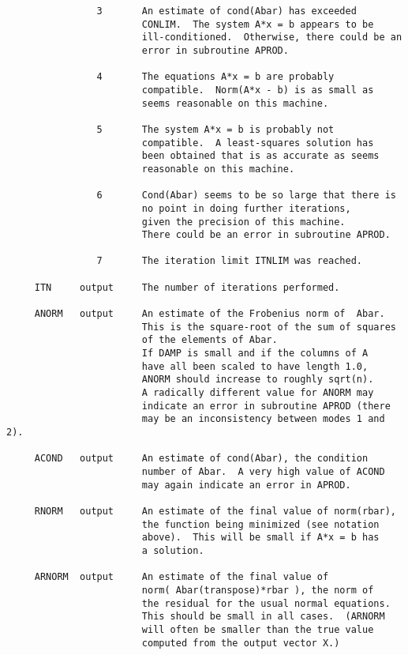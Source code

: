 \begin{verbatim}
                3       An estimate of cond(Abar) has exceeded
                        CONLIM.  The system A*x = b appears to be
                        ill-conditioned.  Otherwise, there could be an
                        error in subroutine APROD.

                4       The equations A*x = b are probably
                        compatible.  Norm(A*x - b) is as small as
                        seems reasonable on this machine.

                5       The system A*x = b is probably not
                        compatible.  A least-squares solution has
                        been obtained that is as accurate as seems
                        reasonable on this machine.

                6       Cond(Abar) seems to be so large that there is
                        no point in doing further iterations,
                        given the precision of this machine.
                        There could be an error in subroutine APROD.

                7       The iteration limit ITNLIM was reached.

     ITN     output     The number of iterations performed.

     ANORM   output     An estimate of the Frobenius norm of  Abar.
                        This is the square-root of the sum of squares
                        of the elements of Abar.
                        If DAMP is small and if the columns of A
                        have all been scaled to have length 1.0,
                        ANORM should increase to roughly sqrt(n).
                        A radically different value for ANORM may
                        indicate an error in subroutine APROD (there
                        may be an inconsistency between modes 1 and 2).

     ACOND   output     An estimate of cond(Abar), the condition
                        number of Abar.  A very high value of ACOND
                        may again indicate an error in APROD.

     RNORM   output     An estimate of the final value of norm(rbar),
                        the function being minimized (see notation
                        above).  This will be small if A*x = b has
                        a solution.

     ARNORM  output     An estimate of the final value of
                        norm( Abar(transpose)*rbar ), the norm of
                        the residual for the usual normal equations.
                        This should be small in all cases.  (ARNORM
                        will often be smaller than the true value
                        computed from the output vector X.)


\end{verbatim}
